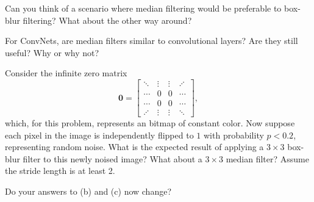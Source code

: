 \documentclass[11pt]{article}
\begin{document}
\begin{subparts}
    Can you think of a scenario where median filtering would be preferable to box-blur filtering? What about the other way around?


    \subpart For ConvNets, are median filters similar to convolutional layers? Are they still useful? Why or why not?


    \newpage
    
    \subpart Consider the infinite zero matrix 
    $$\mathbf{0} = \begin{bmatrix}
        \ddots & \vdots & \vdots & \iddots \\
        \cdots & 0 & 0 & \cdots \\
        \cdots & 0 & 0 & \cdots \\
        \iddots & \vdots & \vdots & \ddots
    \end{bmatrix},$$ which, for this problem, represents an bitmap of constant color. Now suppose each pixel in the image is independently flipped to $1$ with probability $p < 0.2$, representing random noise. What is the expected result of applying a $3 \times 3$ box-blur filter to this newly noised image? What about a $3 \times 3$ median filter? Assume the stride length is at least 2.
    
    Do your answers to (b) and (c) now change?




\end{subparts}
\end{document}
